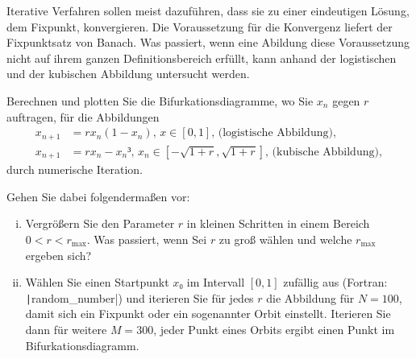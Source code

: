 \begin{question}[subtitle=Bifurkationsdiagramme]
  Iterative Verfahren sollen meist dazuführen, dass sie zu einer eindeutigen Lösung, dem Fixpunkt, konvergieren.
  Die Voraussetzung für die Konvergenz liefert der Fixpunktsatz von Banach.
  Was passiert, wenn eine Abildung diese Voraussetzung nicht auf ihrem ganzen Definitionsbereich erfüllt, kann anhand der logistischen und der kubischen Abbildung untersucht werden.

  Berechnen und plotten Sie die Bifurkationsdiagramme, wo Sie $x_n$ gegen $r$ auftragen, für die Abbildungen
  \begin{align}
    x_{n + 1} & = r x_n (1 - x_n), \, x ∈ [0, 1],\, \text{(logistische Abbildung)}, \\
    x_{n + 1} & = r x_n - x_n³, \, x_n ∈ [-\sqrt{1 + r}, \sqrt{1 + r}], \, \text{(kubische Abbildung)},
  \end{align}
  durch numerische Iteration.

  Gehen Sie dabei folgendermaßen vor:
  \begin{enumerate}[(i)]
  \item  Vergrößern Sie den Parameter $r$ in kleinen Schritten in einem Bereich $0 < r < r_{\text{max}}$.
    Was passiert, wenn Sei $r$ zu groß wählen und welche $r_{\text{max}}$ ergeben sich?
  \item Wählen Sie einen Startpunkt $x₀$ im Intervall $[0, 1]$ zufällig aus (Fortran: \texttt|random_number|) und iterieren Sie für jedes $r$ die Abbildung für $N = 100$, damit sich ein Fixpunkt oder ein sogenannter Orbit einstellt.
    Iterieren Sie dann für weitere $M = 300$, jeder Punkt eines Orbits ergibt einen Punkt im Bifurkationsdiagramm.
  \end{enumerate}
\end{question}

